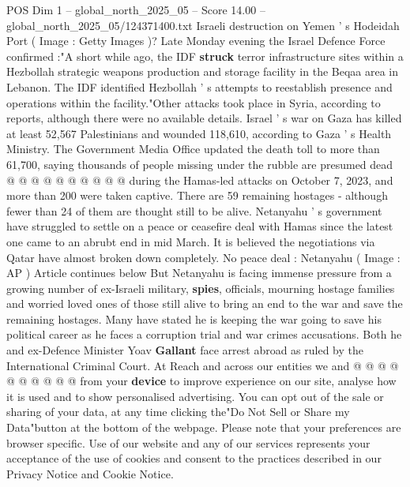 \begin{textsample}{POS Dim 1 – global\_north\_2025\_05 – Score 14.00 – global\_north\_2025\_05/124371400.txt}
Israeli destruction on Yemen ' s Hodeidah Port ( Image : Getty Images )?
Late Monday evening the Israel Defence Force confirmed :"A short while ago, the IDF \textbf{struck} terror infrastructure sites within a Hezbollah strategic weapons production and storage facility in the Beqaa area in Lebanon.
The IDF identified Hezbollah ' s attempts to reestablish presence and operations within the facility."Other attacks took place in Syria, according to reports, although there were no available details.
Israel ' s war on Gaza has killed at least 52,567 Palestinians and wounded 118,610, according to Gaza ' s Health Ministry.
The Government Media Office updated the death toll to more than 61,700, saying thousands of people missing under the rubble are presumed dead @ @ @ @ @ @ @ @ @ @ during the Hamas-led attacks on October 7, 2023, and more than 200 were taken captive.
There are 59 remaining hostages - although fewer than 24 of them are thought still to be alive.
Netanyahu ' s government have struggled to settle on a peace or ceasefire deal with Hamas since the latest one came to an abrubt end in mid March.
It is believed the negotiations via Qatar have almost broken down completely.
No peace deal : Netanyahu ( Image : AP ) Article continues below But Netanyahu is facing immense pressure from a growing number of ex-Israeli military, \textbf{spies}, officials, mourning hostage families and worried loved ones of those still alive to bring an end to the war and save the remaining hostages.
Many have stated he is keeping the war going to save his political career as he faces a corruption trial and war crimes accusations.
Both he and ex-Defence Minister Yoav \textbf{Gallant} face arrest abroad as ruled by the International Criminal Court.
At Reach and across our entities we and @ @ @ @ @ @ @ @ @ @ from your \textbf{device} to improve experience on our site, analyse how it is used and to show personalised advertising.
You can opt out of the sale or sharing of your data, at any time clicking the"Do Not Sell or Share my Data"button at the bottom of the webpage.
Please note that your preferences are browser specific.
Use of our website and any of our services represents your acceptance of the use of cookies and consent to the practices described in our Privacy Notice and Cookie Notice.

\end{textsample}

